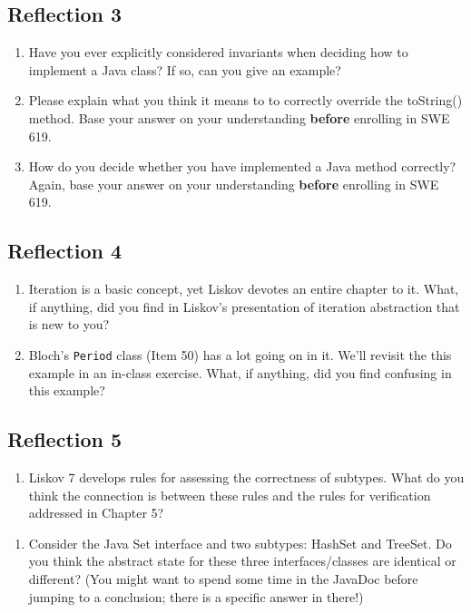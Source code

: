 \documentclass[11pt]{article}
\begin{document}
\subsection{Reflection 3}
\label{sec:org76c7aca}
\begin{enumerate}
\item Have you ever explicitly considered invariants when deciding how to implement a Java class? If so, can you give an example?
\item Please explain what you think it means to to correctly override the toString() method. Base your answer on your understanding \textbf{before} enrolling in SWE 619.
\item How do you decide whether you have implemented a Java method correctly? Again, base your answer on your understanding \textbf{before} enrolling in SWE 619.
\end{enumerate}


\subsection{Reflection 4}
\label{sec:orgf138d1a}
\begin{enumerate}
\item Iteration is a basic concept, yet Liskov devotes an entire chapter to it. What, if anything, did you find in Liskov's presentation of iteration abstraction that is new to you?
\item Bloch's \texttt{Period} class (Item 50) has a lot going on in it. We'll revisit the this example in an in-class exercise. What, if anything, did you find confusing in this example?
\end{enumerate}


\subsection{Reflection 5}
\label{sec:org7faba0e}

\begin{enumerate}
\item Liskov 7 develops rules for assessing the correctness of subtypes. What do you think the connection is between these rules and the rules for verification addressed in Chapter 5?
\end{enumerate}

\begin{enumerate}
\item Consider the Java Set interface and two subtypes: HashSet and TreeSet. Do you think the abstract state for these three interfaces/classes are identical or different? (You might want to spend some time in the JavaDoc before jumping to a conclusion; there is a specific answer in there!)
\end{enumerate}
\end{document}
